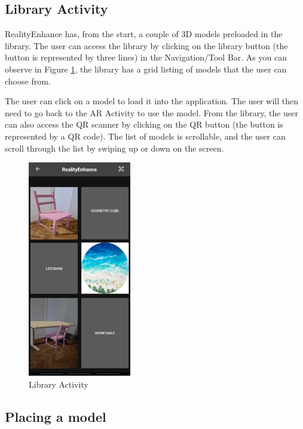 \subsection{Library Activity}
RealityEnhance has, from the start, a couple of \ac{3D} models preloaded in the library. The user can access the library by clicking on the library button (the button is represented by three lines) in the Navigation/Tool Bar. As you can observe in Figure \ref{fig:library}, the library has a grid listing of models that the user can choose from.

The user can click on a model to load it into the application. The user will then need to go back to the \ac{AR} Activity to use the model. From the library, the user can also access the QR scanner by clicking on the QR button (the button is represented by a QR code). The list of models is scrollable, and the user can scroll through the list by swiping up or down on the screen.

\begin{figure}[ht]
    \begin{center}
        \includegraphics[width=0.4\textwidth]{img/App_screenshots/Library.jpg}
        \caption{Library Activity}
        \label{fig:library}
    \end{center}
\end{figure}
\pagebreak

\subsection{Placing a model}

